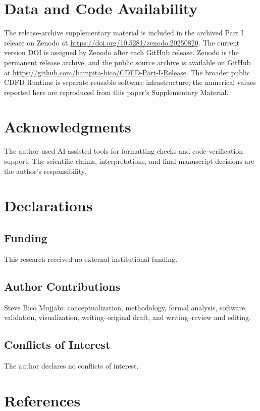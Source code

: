 \documentclass[11pt]{article}
\begin{document}
\section*{Data and Code Availability}

The release-archive supplementary material is included in the archived Part I
release on Zenodo at \url{https://doi.org/10.5281/zenodo.20250820}. The current version DOI is assigned by Zenodo after each GitHub release. Zenodo is the
permanent release archive, and the public source archive is available on GitHub at
\url{https://github.com/bampita-bico/CDFD-Part-I-Release}. The broader public CDFD
Runtime is separate reusable software infrastructure; the numerical values reported
here are reproduced from this paper's Supplementary Material.

\section*{Acknowledgments}

The author used AI-assisted tools for formatting checks and code-verification
support. The scientific claims, interpretations, and final manuscript decisions
are the author's responsibility.

\section*{Declarations}

\subsection*{Funding}
This research received no external institutional funding.

\subsection*{Author Contributions}
Steve Bico Mujjabi: conceptualization, methodology, formal analysis, software,
validation, visualization, writing--original draft, and writing--review and
editing.

\subsection*{Conflicts of Interest}
The author declares no conflicts of interest.

\section*{References}


\end{document}
